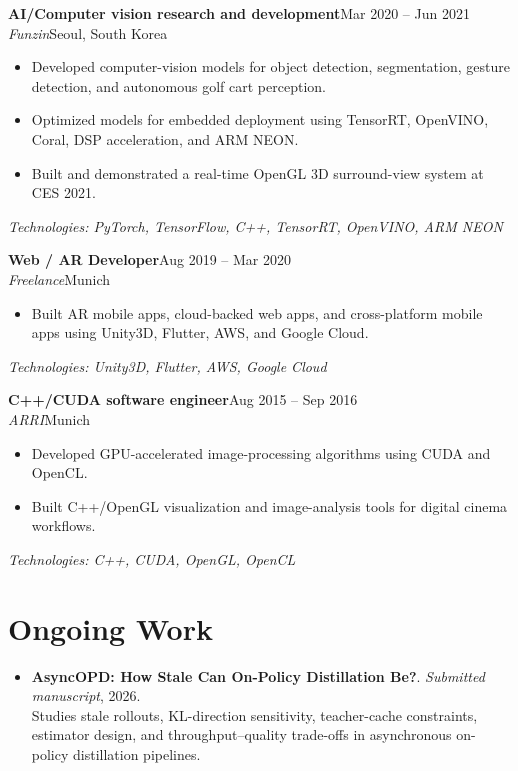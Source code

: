 \documentclass[10pt,a4paper]{article}
\newcommand{\cvevent}[4]{%
  \noindent\textbf{#1}\hfill{\small\color{lightgray}#3}\\
  \textit{#2}\hfill{\small\color{lightgray}#4}
  \vspace{2pt}
}
\begin{document}
\cvevent{AI/Computer vision research and development}{Funzin}{Mar 2020 -- Jun 2021}{Seoul, South Korea}
\begin{itemize}
  \item Developed computer-vision models for object detection, segmentation, gesture detection, and autonomous golf cart perception.
  \item Optimized models for embedded deployment using TensorRT, OpenVINO, Coral, DSP acceleration, and ARM NEON.
  \item Built and demonstrated a real-time OpenGL 3D surround-view system at CES 2021.
\end{itemize}
\noindent\textit{\small Technologies: PyTorch, TensorFlow, C++, TensorRT, OpenVINO, ARM NEON}
\vspace{6pt}

\cvevent{Web / AR Developer}{Freelance}{Aug 2019 -- Mar 2020}{Munich}
\begin{itemize}
  \item Built AR mobile apps, cloud-backed web apps, and cross-platform mobile apps using Unity3D, Flutter, AWS, and Google Cloud.
\end{itemize}
\noindent\textit{\small Technologies: Unity3D, Flutter, AWS, Google Cloud}
\vspace{6pt}

\cvevent{C++/CUDA software engineer}{ARRI}{Aug 2015 -- Sep 2016}{Munich}
\begin{itemize}
  \item Developed GPU-accelerated image-processing algorithms using CUDA and OpenCL.
  \item Built C++/OpenGL visualization and image-analysis tools for digital cinema workflows.
\end{itemize}
\noindent\textit{\small Technologies: C++, CUDA, OpenGL, OpenCL}
\vspace{6pt}


\section{Ongoing Work}
\begin{itemize}[leftmargin=1.2em]
  \item \textbf{AsyncOPD: How Stale Can On-Policy Distillation Be?}.
\textit{Submitted manuscript}, 2026.\\
Studies stale rollouts, KL-direction sensitivity, teacher-cache constraints, estimator design, and throughput--quality trade-offs in asynchronous on-policy distillation pipelines.
\end{itemize}
\end{document}
